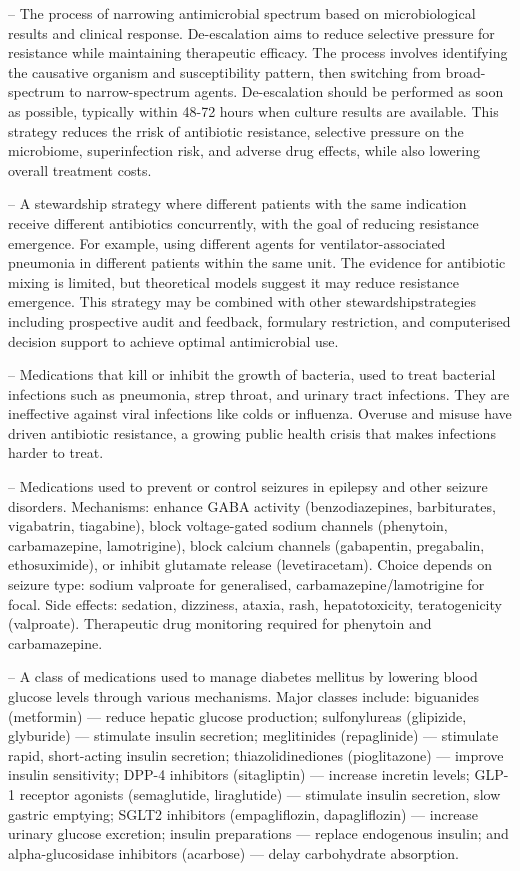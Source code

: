 -- The process of narrowing antimicrobial spectrum based on microbiological results and clinical response. De-escalation aims to reduce selective pressure for resistance while maintaining therapeutic efficacy. The process involves identifying the causative organism and susceptibility pattern, then switching from broad-spectrum to narrow-spectrum agents. De-escalation should be performed as soon as possible, typically within 48-72 hours when culture results are available. This strategy reduces the rrisk of antibiotic resistance, selective pressure on the microbiome, superinfection risk, and adverse drug effects, while also lowering overall treatment costs.

-- A stewardship strategy where different patients with the same indication receive different antibiotics concurrently, with the goal of reducing resistance emergence. For example, using different agents for ventilator-associated pneumonia in different patients within the same unit. The evidence for antibiotic mixing is limited, but theoretical models suggest it may reduce resistance emergence. This strategy may be combined with other stewardshipstrategies including prospective audit and feedback, formulary restriction, and computerised decision support to achieve optimal antimicrobial use.

-- Medications that kill or inhibit the growth of bacteria, used to treat bacterial infections such as pneumonia, strep throat, and urinary tract infections. They are ineffective against viral infections like colds or influenza. Overuse and misuse have driven antibiotic resistance, a growing public health crisis that makes infections harder to treat.

-- Medications used to prevent or control seizures in epilepsy and other seizure disorders. Mechanisms: enhance GABA activity (benzodiazepines, barbiturates, vigabatrin, tiagabine), block voltage-gated sodium channels (phenytoin, carbamazepine, lamotrigine), block calcium channels (gabapentin, pregabalin, ethosuximide), or inhibit glutamate release (levetiracetam). Choice depends on seizure type: sodium valproate for generalised, carbamazepine/lamotrigine for focal. Side effects: sedation, dizziness, ataxia, rash, hepatotoxicity, teratogenicity (valproate). Therapeutic drug monitoring required for phenytoin and carbamazepine.

-- A class of medications used to manage diabetes mellitus by lowering blood glucose levels through various mechanisms. Major classes include: biguanides (metformin) — reduce hepatic glucose production; sulfonylureas (glipizide, glyburide) — stimulate insulin secretion; meglitinides (repaglinide) — stimulate rapid, short-acting insulin secretion; thiazolidinediones (pioglitazone) — improve insulin sensitivity; DPP-4 inhibitors (sitagliptin) — increase incretin levels; GLP-1 receptor agonists (semaglutide, liraglutide) — stimulate insulin secretion, slow gastric emptying; SGLT2 inhibitors (empagliflozin, dapagliflozin) — increase urinary glucose excretion; insulin preparations — replace endogenous insulin; and alpha-glucosidase inhibitors (acarbose) — delay carbohydrate absorption.

